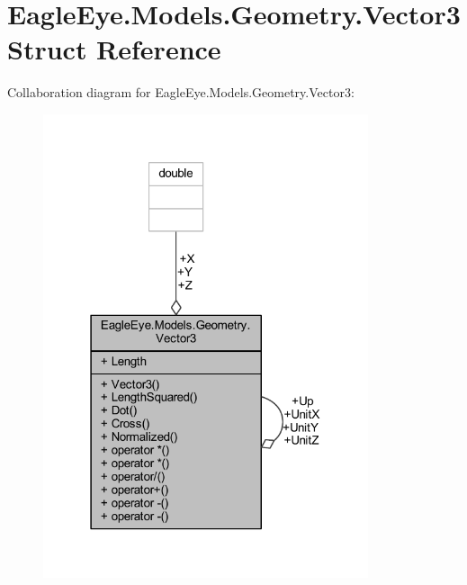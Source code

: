 \hypertarget{struct_eagle_eye_1_1_models_1_1_geometry_1_1_vector3}{}\section{Eagle\+Eye.\+Models.\+Geometry.\+Vector3 Struct Reference}
\label{struct_eagle_eye_1_1_models_1_1_geometry_1_1_vector3}


Collaboration diagram for Eagle\+Eye.\+Models.\+Geometry.\+Vector3\+:\nopagebreak
\begin{figure}[H]
\begin{center}
\leavevmode
\includegraphics[width=271pt]{struct_eagle_eye_1_1_models_1_1_geometry_1_1_vector3__coll__graph}
\end{center}
\end{figure}

